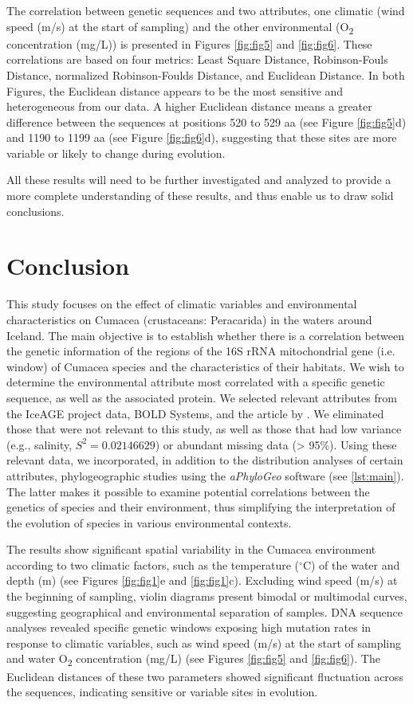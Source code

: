 The correlation between genetic sequences and two attributes, one climatic (wind speed (m/s) at the start of sampling) and the other environmental (O\textsubscript{2} concentration (mg/L)) is presented in Figures  \ref{fig:fig5} and  \ref{fig:fig6}. These correlations are based on four metrics: Least Square Distance, Robinson-Fouls Distance, normalized Robinson-Foulds Distance, and Euclidean Distance. In both Figures, the Euclidean distance appears to be the most sensitive and heterogeneous from our data. A higher Euclidean distance means a greater difference between the sequences at positions 520 to 529 aa (see Figure \ref{fig:fig5}d) and 1190 to 1199 aa (see Figure \ref{fig:fig6}d), suggesting that these sites are more variable or likely to change during evolution.

All these results will need to be further investigated and analyzed to provide a more complete understanding of these results, and thus enable us to draw solid conclusions.

\section{Conclusion}\label{conclusion}

This study focuses on the effect of climatic variables and environmental characteristics on Cumacea (crustaceans: Peracarida) in the waters around Iceland. The main objective is to establish whether there is a correlation between the genetic information of the regions of the 16S rRNA mitochondrial gene (i.e. window) of Cumacea species and the characteristics of their habitats. We wish to determine the environmental attribute most correlated with a specific genetic sequence, as well as the associated protein. We selected relevant attributes from the IceAGE project data, BOLD Systems, and the article by \citep{uhlir_adding_2021}. We eliminated those that were not relevant to this study, as well as those that had low variance (e.g., salinity, $S^2 = 0.02146629$) or abundant missing data (> 95\%). Using these relevant data, we incorporated, in addition to the distribution analyses of certain attributes, phylogeographic studies using the \textit{aPhyloGeo} software (see \autoref{lst:main}). The latter makes it possible to examine potential correlations between the genetics of species and their environment, thus simplifying the interpretation of the evolution of species in various environmental contexts.

The results show significant spatial variability in the Cumacea environment according to two climatic factors, such as the temperature ($^\circ$C) of the water and depth (m) (see Figures \ref{fig:fig1}e and \ref{fig:fig1}c). Excluding wind speed (m/s) at the beginning of sampling, violin diagrams present bimodal or multimodal curves, suggesting geographical and environmental separation of samples. DNA sequence analyses revealed specific genetic windows exposing high mutation rates in response to climatic variables, such as wind speed (m/s) at the start of sampling and water O\textsubscript{2} concentration (mg/L) (see Figures \ref{fig:fig5} and \ref{fig:fig6}). The Euclidean distances of these two parameters showed significant fluctuation across the sequences, indicating sensitive or variable sites in evolution.

